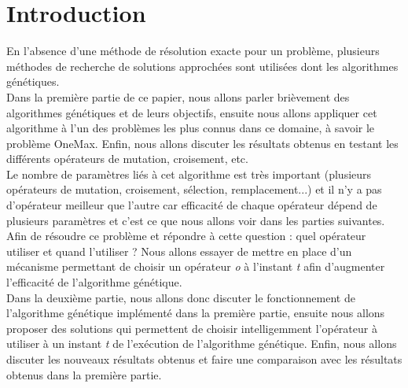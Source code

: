 \documentclass[12pt]{article}
\begin{document}
\section{Introduction}
En l'absence d'une méthode de résolution exacte pour un problème, plusieurs méthodes de recherche de solutions approchées sont utilisées dont les algorithmes génétiques.\\
 
Dans la première partie de ce papier, nous allons parler brièvement des algorithmes génétiques et de leurs objectifs, ensuite nous allons appliquer cet algorithme à l'un des problèmes les plus connus dans ce domaine, à savoir le problème OneMax. Enfin, nous allons discuter les résultats obtenus en testant les différents opérateurs de mutation, croisement, etc.\\

Le nombre de paramètres liés à cet algorithme est très important (plusieurs opérateurs de mutation, croisement, sélection, remplacement...) et il n'y a pas d'opérateur meilleur que l'autre car efficacité de chaque opérateur dépend de plusieurs paramètres et c'est ce que nous allons voir dans les parties suivantes. Afin de résoudre ce problème et répondre à cette question : quel opérateur utiliser et quand l'utiliser ? Nous allons essayer de mettre en place d'un mécanisme permettant de choisir un opérateur \textit{o} à l'instant \textit{t} afin d'augmenter l'efficacité de l'algorithme génétique.\\

Dans la deuxième partie, nous allons donc discuter le fonctionnement de l'algorithme génétique implémenté dans la première partie, ensuite nous allons proposer des solutions qui permettent de choisir intelligemment l'opérateur à utiliser à un instant \textit{t} de l'exécution de l'algorithme génétique. Enfin, nous allons discuter les nouveaux résultats obtenus et faire une comparaison avec les résultats obtenus dans la première partie.

\end{document}
